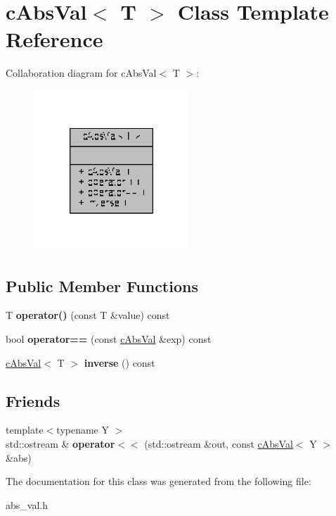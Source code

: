 \hypertarget{classcAbsVal}{\section{c\-Abs\-Val$<$ T $>$ Class Template Reference}
\label{classcAbsVal}
}


Collaboration diagram for c\-Abs\-Val$<$ T $>$\-:
\nopagebreak
\begin{figure}[H]
\begin{center}
\leavevmode
\includegraphics[width=166pt]{classcAbsVal__coll__graph}
\end{center}
\end{figure}
\subsection*{Public Member Functions}
\begin{DoxyCompactItemize}
\item 
\hypertarget{classcAbsVal_a6328674dbb95229744ce46d55997fbd7}{T {\bfseries operator()} (const T \&value) const }\label{classcAbsVal_a6328674dbb95229744ce46d55997fbd7}

\item 
\hypertarget{classcAbsVal_aef83a1c9e03ba6f59b2f79ad8ba31b44}{bool {\bfseries operator==} (const \hyperlink{classcAbsVal}{c\-Abs\-Val} \&exp) const }\label{classcAbsVal_aef83a1c9e03ba6f59b2f79ad8ba31b44}

\item 
\hypertarget{classcAbsVal_abfd194787ab9ebb30041170ff8c69295}{\hyperlink{classcAbsVal}{c\-Abs\-Val}$<$ T $>$ {\bfseries inverse} () const }\label{classcAbsVal_abfd194787ab9ebb30041170ff8c69295}

\end{DoxyCompactItemize}
\subsection*{Friends}
\begin{DoxyCompactItemize}
\item 
\hypertarget{classcAbsVal_a290a09641d60e6d96c20b7179b7b1bcc}{{\footnotesize template$<$typename Y $>$ }\\std\-::ostream \& {\bfseries operator$<$$<$} (std\-::ostream \&out, const \hyperlink{classcAbsVal}{c\-Abs\-Val}$<$ Y $>$ \&abs)}\label{classcAbsVal_a290a09641d60e6d96c20b7179b7b1bcc}

\end{DoxyCompactItemize}


The documentation for this class was generated from the following file\-:\begin{DoxyCompactItemize}
\item 
abs\-\_\-val.\-h\end{DoxyCompactItemize}
